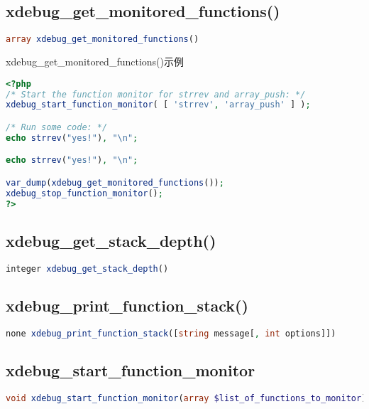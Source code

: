 \subsection{xdebug\_get\_monitored\_functions()}


\begin{lstlisting}[language=PHP]
array xdebug_get_monitored_functions()
\end{lstlisting}




\begin{example}
xdebug\_get\_monitored\_functions()示例
\begin{lstlisting}[language=PHP]
<?php
/* Start the function monitor for strrev and array_push: */
xdebug_start_function_monitor( [ 'strrev', 'array_push' ] );

/* Run some code: */
echo strrev("yes!"), "\n";

echo strrev("yes!"), "\n";

var_dump(xdebug_get_monitored_functions());
xdebug_stop_function_monitor();
?>  
\end{lstlisting}
\end{example}

\subsection{xdebug\_get\_stack\_depth()}


\begin{lstlisting}[language=PHP]
integer xdebug_get_stack_depth()
\end{lstlisting}



\subsection{xdebug\_print\_function\_stack()}


\begin{lstlisting}[language=PHP]
none xdebug_print_function_stack([string message[, int options]])
\end{lstlisting}


\subsection{xdebug\_start\_function\_monitor}



\begin{lstlisting}[language=PHP]
void xdebug_start_function_monitor(array $list_of_functions_to_monitor)
\end{lstlisting}




